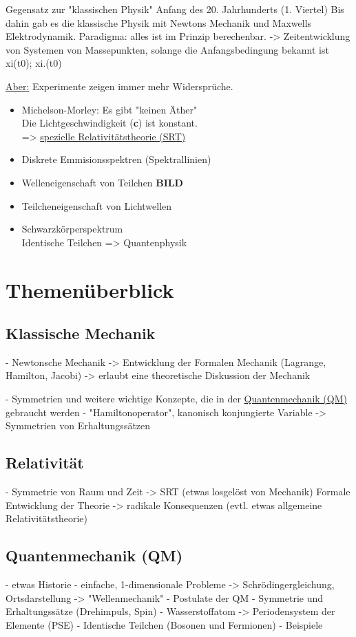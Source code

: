 Gegensatz zur "klassischen Physik"
Anfang des 20. Jahrhunderts (1. Viertel)
Bis dahin gab es die klassische Physik mit Newtons Mechanik und Maxwells Elektrodynamik.
Paradigma: alles ist im Prinzip berechenbar.
-> Zeitentwicklung von Systemen von Massepunkten, solange die Anfangsbedingung bekannt ist
xi(t0); xi.(t0)

\underline{Aber:} Experimente zeigen immer mehr Widerspr\"uche.
\begin{itemize}
  \item Michelson-Morley: Es gibt "keinen \"Ather"\\
        Die Lichtgeschwindigkeit (\textbf{c}) ist konstant.\\
        => \underline{spezielle Relativit\"atstheorie (SRT)}
  \item Diskrete Emmisionsspektren (Spektrallinien)
  \item Welleneigenschaft von Teilchen \textbf{BILD}
  \item Teilcheneigenschaft von Lichtwellen
  \item Schwarzk\"orperspektrum\\
        Identische Teilchen
        => Quantenphysik
\end{itemize}

\section{Themen\"uberblick}
\subsection{Klassische Mechanik}
- Newtonsche Mechanik
-> Entwicklung der Formalen Mechanik (Lagrange, Hamilton, Jacobi)
-> erlaubt eine theoretische Diskussion der Mechanik

- Symmetrien und weitere wichtige Konzepte, die in der \underline{Quantenmechanik (QM)} gebraucht werden
- "Hamiltonoperator", kanonisch konjungierte Variable
-> Symmetrien von Erhaltungss\"atzen

\subsection{Relativit\"at}
- Symmetrie von Raum und Zeit
-> SRT (etwas losgel\"ost von Mechanik)
Formale Entwicklung der Theorie
-> radikale Konsequenzen
(evtl. etwas allgemeine Relativit\"atstheorie)

\subsection{Quantenmechanik (QM)}
- etwas Historie
- einfache, 1-dimensionale Probleme
-> Schr\"odingergleichung, Ortsdarstellung
-> "Wellenmechanik"
- Postulate der QM
- Symmetrie und Erhaltungss\"atze (Drehimpuls, Spin)
- Wasserstoffatom
-> Periodensystem der Elemente (PSE)
- Identische Teilchen (Bosonen und Fermionen)
- Beispiele